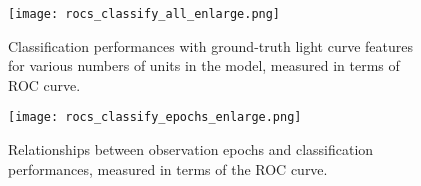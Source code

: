 \documentclass[conference,compsoc]{IEEEtran}
\begin{document}
\begin{figure}[t]
  \begin{center}
    \texttt{[image: rocs\_classify\_all\_enlarge.png]}
  \end{center}
  \caption{%
    Classification performances with ground-truth light curve features for various numbers of units in the model, measured in terms of ROC curve.
  }
  \label{fig:roc_classify}
\end{figure}

\begin{figure}[t]
  \begin{center}
    \texttt{[image: rocs\_classify\_epochs\_enlarge.png]}
  \end{center}
  \caption{%
    Relationships between observation epochs and classification performances, measured in terms of the ROC curve.
  }
  \label{fig:roc_classify_epoch}
\end{figure}



\end{document}
